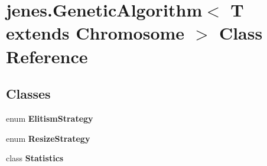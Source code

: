 \hypertarget{classjenes_1_1_genetic_algorithm_3_01_t_01extends_01_chromosome_01_4}{\section{jenes.\-Genetic\-Algorithm$<$ T extends Chromosome $>$ Class Reference}
\label{classjenes_1_1_genetic_algorithm_3_01_t_01extends_01_chromosome_01_4}
}
\subsection*{Classes}
\begin{DoxyCompactItemize}
\item 
enum {\bfseries Elitism\-Strategy}
\item 
enum {\bfseries Resize\-Strategy}
\item 
class {\bfseries Statistics}
\end{DoxyCompactItemize}

